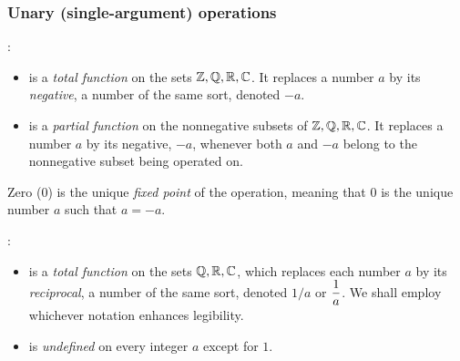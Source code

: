\subsubsection{Unary (single-argument) operations}

%
:
\begin{itemize}
\item
is a {\em total function} on the sets $\mathbb{Z}, \mathbb{Q}, \mathbb{R}, \mathbb{C}$.  It replaces
a number $a$ by its {\em negative},
a number of the same sort, denoted $-a$.
\item
is a {\em partial function} on the nonnegative subsets
of $\mathbb{Z}, \mathbb{Q}, \mathbb{R}, \mathbb{C}$.  It replaces a number $a$ by its negative, $-a$,
whenever both $a$ and $-a$ belong to the nonnegative subset being
operated on.
\end{itemize}
Zero ($0$) is the unique {\it fixed point} of the operation,
meaning that $0$ is the unique number $a$ such that $a = -a$.

\medskip

:
\begin{itemize}
\item
{}
is a {\em total function} on the sets $\mathbb{Q}, \mathbb{R}, \mathbb{C}$, which replaces each
number $a$ by its {\em reciprocal}, 
a number of the same sort, denoted $1/a$ or $\displaystyle {1 \over
  a}$.  We shall employ whichever notation enhances legibility.

\item
is {\em undefined} on every integer $a$ except for $1$.
\end{itemize}

\medskip


